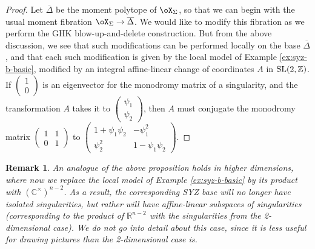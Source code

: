 \documentclass[10pt,a4paper]{amsart}
\numberwithin{equation}{section}
\newtheorem{Remark}[Theorem]{Remark} }
\def\CC{\mathbb{C}}
\def\RR{\mathbb{R}}
\def\ZZ{\mathbb{Z}}
\newcommand\SL{\textup{SL}}
\begin{document}
\begin{proof}Let $\overline{\Delta}$ be the moment polytope of $\oX_\Sigma$, so that we can begin with the usual moment fibration $\oX_\Sigma\to \overline{\Delta}$. We would like to modify this fibration as we perform the GHK blow-up-and-delete construction. But from the above discussion, we see that such modifications can be performed locally on the base $\overline{\Delta}$, and that each such modification is given by the local model of
 Example \ref{ex:syz-b-basic}, modified by an integral affine-linear change of coordinates $A$ in $\SL(2,\ZZ)$. If
 $\left(\begin{smallmatrix}1\\0\end{smallmatrix}\right)$ is an eigenvector for the monodromy matrix of a singularity, and the transformation $A$ takes it to
 $\left(\begin{smallmatrix}\psi_1\\\psi_2\end{smallmatrix}\right)$,
 then $A$ must conjugate the monodromy matrix
 $\left(\begin{smallmatrix}1&1\\0&1\end{smallmatrix}\right)$ to
 $\left(\begin{smallmatrix}1+\psi_1\psi_2&-\psi_1^2\\\psi_2^2&1-\psi_1\psi_2\end{smallmatrix}\right)$.
\end{proof}

\begin{Remark}
 An analogue of the above proposition holds in higher dimensions, where now we replace the local model of Example \ref{ex:syz-b-basic} by its product with $(\CC^\times)^{n-2}$. As a result, the corresponding SYZ base will no longer have isolated singularities, but rather will have affine-linear subspaces of singularities (corresponding to the product of $\RR^{n-2}$ with the singularities from the 2-dimensional case). We do not go into detail about this case, since it is less useful for drawing pictures than the 2-dimensional case is.
\end{Remark}
\end{document}
